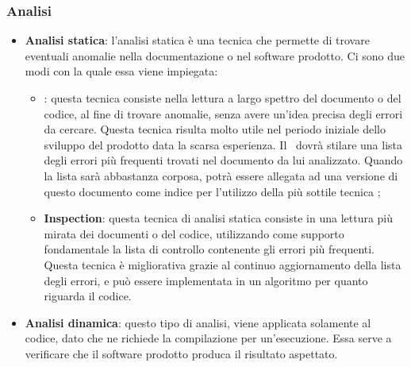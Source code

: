 \documentclass[../NormeDiProgetto.tex]{subfiles}
\begin{document}
\subsubsection{Analisi}
\begin{itemize}
\item \textbf{Analisi statica}:
l'analisi statica è una tecnica che permette di trovare eventuali anomalie nella
documentazione o nel software prodotto. Ci sono due modi con la quale essa viene
impiegata:
\begin{itemize}
  \item \textbf{}: questa tecnica consiste nella lettura a largo spettro del documento o del codice, al fine di trovare anomalie, senza avere un'idea precisa degli errori da cercare.
Questa tecnica risulta molto utile nel periodo iniziale dello sviluppo del prodotto data la scarsa esperienza. Il \verificatore\ dovrà stilare una lista degli errori più frequenti trovati nel documento da lui analizzato. Quando la lista sarà abbastanza corposa, potrà essere allegata ad una versione di questo documento come indice per l'utilizzo della più sottile tecnica ;
  \item \textbf{Inspection}: questa tecnica di analisi statica consiste in una lettura più mirata dei documenti o del codice, utilizzando come supporto fondamentale la lista di controllo contenente gli errori più frequenti. Questa tecnica è migliorativa grazie al continuo aggiornamento della lista degli errori, e può essere implementata in un algoritmo per quanto riguarda il codice.
\end{itemize}
\item \textbf{Analisi dinamica}:
questo tipo di analisi, viene applicata solamente al codice, dato che ne richiede la compilazione per un'esecuzione. Essa serve a verificare che il software prodotto produca il risultato aspettato.
\end{itemize}
\end{document}
